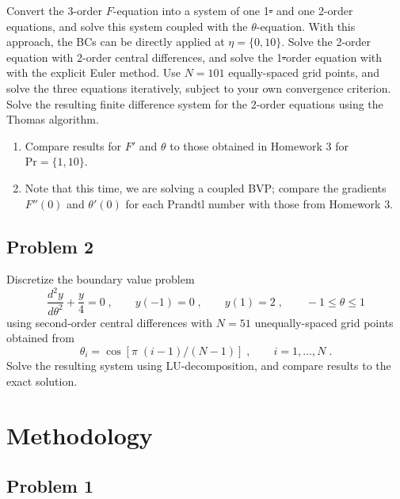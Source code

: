 \documentclass[12pt]{article}
\begin{document}
Convert the 3\rd-order $F$-equation into a system of one 1\st- and one 2\nd-order equations, and solve this system coupled with the $\theta$-equation. With this approach, the BCs can be directly applied at $\eta = \{0, 10\}$. Solve the 2\nd-order equation with 2\nd-order central differences, and solve the 1\st-order equation with with the explicit Euler method. Use $N = 101$ equally-spaced grid points, and solve the three equations iteratively, subject to your own convergence criterion. Solve the resulting finite difference system for the 2\nd-order equations using the Thomas algorithm.
\begin{enumerate}
\item Compare results for $F'$ and $\theta$ to those obtained in Homework 3 for $\text{Pr} = \{1, 10\}$.
\item Note that this time, we are solving a coupled BVP; compare the gradients $F''(0)$ and $\theta'(0)$ for each Prandtl number with those from Homework 3.
\end{enumerate}

\subsection{Problem 2}

Discretize the boundary value problem
\begin{equation}
\frac{d^2 y}{d \theta^2} + \frac{y}{4} = 0
\;,\qquad
y(-1) = 0
\;,\qquad
y(1) = 2
\;,\qquad
-1 \le \theta \le 1
\end{equation}
using second-order central differences with $N = 51$ unequally-spaced grid points obtained from
\begin{equation}
\theta_i = \cos \left[ \pi \; (i-1) / (N-1) \right]
\;,\qquad
i = 1, \dots, N
\;.
\end{equation}
Solve the resulting system using LU-decomposition, and compare results to the exact solution.

\section{Methodology} %

\subsection{Problem 1}
\end{document}
